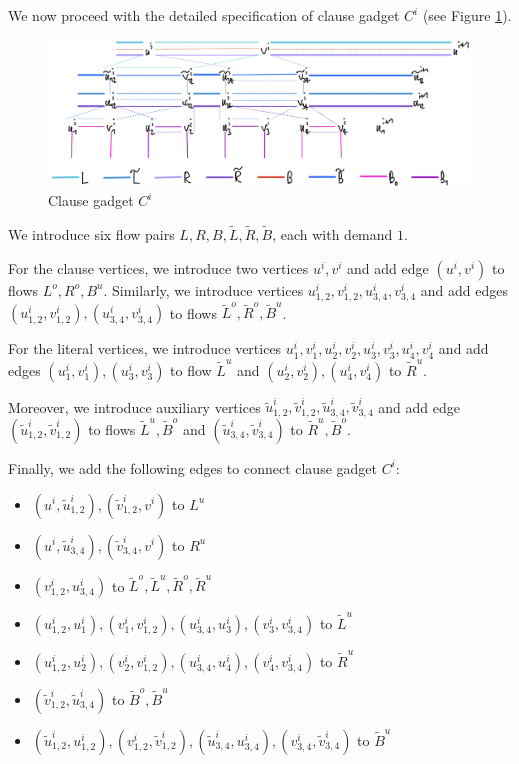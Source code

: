 \documentclass[fontsize=11pt,paper=a4]{book}
\begin{document}
We now proceed with the detailed specification of clause gadget \(C^i\) (see Figure \ref{fig:org5b5792f}).

\begin{figure}[htbp]
\centering
\includegraphics[width=.9\linewidth]{../assets/Screen Shot 2023-02-14 at 15.07.03.png}
\caption{\label{fig:org5b5792f}Clause gadget \(C^i\)}
\end{figure}

We introduce six flow pairs \(L,R,B,\tilde{L},\tilde{R},\tilde{B}\), each with demand \(1\).

For the clause vertices, we introduce two vertices \(u^i,v^i\) and add edge \((u^i,v^i)\) to flows \(L^o,R^o,B^u\).
Similarly, we introduce vertices \(u_{1,2}^i,v_{1,2}^i,u_{3,4}^i,v_{3,4}^i\) and add edges \((u_{1,2}^i,v_{1,2}^i),(u_{3,4}^i,v_{3,4}^i)\) to flows \(\tilde{L}^o,\tilde{R}^o,\tilde{B}^u\).

For the literal vertices, we introduce vertices \(u_1^i,v_1^i,u_2^i,v_2^i,u_3^i,v_3^i,u_4^i,v_4^i\) and add edges \((u_1^i,v_1^i),(u_3^i,v_3^i)\) to flow \(\tilde{L}^u\) and \((u_2^i,v_2^i),(u_4^i,v_4^i)\) to \(\tilde{R}^u\).

Moreover, we introduce auxiliary vertices \(\tilde{u}_{1,2}^i,\tilde{v}_{1,2}^i,\tilde{u}_{3,4}^i,\tilde{v}_{3,4}^i\) and add edge \((\tilde{u}_{1,2}^i,\tilde{v}_{1,2}^i)\) to flows \(\tilde{L}^u,\tilde{B}^o\) and \((\tilde{u}_{3,4}^i,\tilde{v}_{3,4}^i)\) to \(\tilde{R}^u,\tilde{B}^o\).

Finally, we add the following edges to connect clause gadget \(C^i\):

\begin{itemize}
\item \((u^i,\tilde{u}_{1,2}^i),(\tilde{v}_{1,2}^i,v^i)\) to \(L^u\)
\item \((u^i,\tilde{u}_{3,4}^i),(\tilde{v}_{3,4}^i,v^i)\) to \(R^u\)
\item \((v_{1,2}^i,u_{3,4}^i)\) to \(\tilde{L}^o,\tilde{L}^u,\tilde{R}^o,\tilde{R}^u\)
\item \((u_{1,2}^i,u_1^i),(v_1^i,v_{1,2}^i),(u_{3,4}^i,u_3^i),(v_3^i,v_{3,4}^i)\) to \(\tilde{L}^u\)
\item \((u_{1,2}^i,u_2^i),(v_2^i,v_{1,2}^i),(u_{3,4}^i,u_4^i),(v_4^i,v_{3,4}^i)\) to \(\tilde{R}^u\)
\item \((\tilde{v}_{1,2}^i,\tilde{u}_{3,4}^i)\) to \(\tilde{B}^o,\tilde{B}^u\)
\item \((\tilde{u}_{1,2}^i,u_{1,2}^i),(v_{1,2}^i,\tilde{v}_{1,2}^i),(\tilde{u}_{3,4}^i,u_{3,4}^i),(v_{3,4}^i,\tilde{v}_{3,4}^i)\) to \(\tilde{B}^u\)
\end{itemize}
\end{document}
